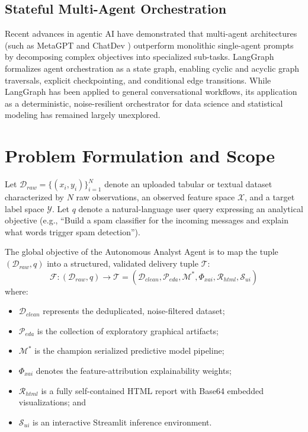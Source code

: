 \documentclass[conference]{IEEEtran}
\begin{document}
\subsection{Stateful Multi-Agent Orchestration}
Recent advances in agentic AI have demonstrated that multi-agent architectures (such as MetaGPT \cite{hong2023metagpt} and ChatDev \cite{qian2023chatdev}) outperform monolithic single-agent prompts by decomposing complex objectives into specialized sub-tasks. LangGraph \cite{langgraphdocs} formalizes agent orchestration as a state graph, enabling cyclic and acyclic graph traversals, explicit checkpointing, and conditional edge transitions. While LangGraph has been applied to general conversational workflows, its application as a deterministic, noise-resilient orchestrator for data science and statistical modeling has remained largely unexplored.

\section{Problem Formulation and Scope}
Let $\mathcal{D}_{raw} = \{(x_i, y_i)\}_{i=1}^{N}$ denote an uploaded tabular or textual dataset characterized by $N$ raw observations, an observed feature space $\mathcal{X}$, and a target label space $\mathcal{Y}$. Let $q$ denote a natural-language user query expressing an analytical objective (e.g., ``Build a spam classifier for the incoming messages and explain what words trigger spam detection'').

The global objective of the Autonomous Analyst Agent is to map the tuple $(\mathcal{D}_{raw}, q)$ into a structured, validated delivery tuple $\mathcal{T}$:
\begin{equation}
    \mathcal{F}: (\mathcal{D}_{raw}, q) \longrightarrow \mathcal{T} = (\mathcal{D}_{clean}, \mathcal{P}_{eda}, \mathcal{M}^*, \Phi_{xai}, \mathcal{R}_{html}, \mathcal{S}_{ui})
\end{equation}
where:
\begin{itemize}
    \item $\mathcal{D}_{clean}$ represents the deduplicated, noise-filtered dataset;
    \item $\mathcal{P}_{eda}$ is the collection of exploratory graphical artifacts;
    \item $\mathcal{M}^*$ is the champion serialized predictive model pipeline;
    \item $\Phi_{xai}$ denotes the feature-attribution explainability weights;
    \item $\mathcal{R}_{html}$ is a fully self-contained HTML report with Base64 embedded visualizations; and
    \item $\mathcal{S}_{ui}$ is an interactive Streamlit inference environment.
\end{itemize}
\end{document}
